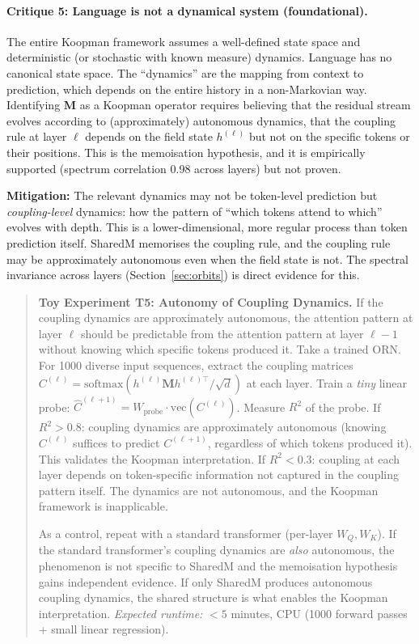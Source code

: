 \documentclass[11pt, a4paper]{article}
\newcommand{\M}{\mathbf{M}}
\theoremstyle{plain}
\theoremstyle{remark}
\begin{document}
\paragraph{Critique 5: Language is not a dynamical system (foundational).}
The entire Koopman framework assumes a well-defined state space and deterministic (or stochastic with known measure) dynamics.
Language has no canonical state space.
The ``dynamics'' are the mapping from context to prediction, which depends on the entire history in a non-Markovian way.
Identifying $\M$ as a Koopman operator requires believing that the residual stream evolves according to (approximately) autonomous dynamics, that the coupling rule at layer $\ell$ depends on the field state $h^{(\ell)}$ but not on the specific tokens or their positions.
This is the memoisation hypothesis, and it is empirically supported (spectrum correlation 0.98 across layers) but not proven.

\textbf{Mitigation:} The relevant dynamics may not be token-level prediction but \emph{coupling-level} dynamics: how the pattern of ``which tokens attend to which'' evolves with depth.
This is a lower-dimensional, more regular process than token prediction itself.
SharedM memorises the coupling rule, and the coupling rule may be approximately autonomous even when the field state is not.
The spectral invariance across layers (Section~\ref{sec:orbits}) is direct evidence for this.

\begin{quote}\small
\textbf{Toy Experiment T5: Autonomy of Coupling Dynamics.}
If the coupling dynamics are approximately autonomous, the attention pattern at layer $\ell$ should be predictable from the attention pattern at layer $\ell{-}1$ without knowing which specific tokens produced it.
Take a trained ORN.
For 1000 diverse input sequences, extract the coupling matrices $C^{(\ell)} = \text{softmax}(h^{(\ell)} \M h^{(\ell)\top}/\sqrt{d})$ at each layer.
Train a \emph{tiny} linear probe: $\hat{C}^{(\ell+1)} = W_{\text{probe}} \cdot \text{vec}(C^{(\ell)})$.
Measure $R^2$ of the probe.
If $R^2 > 0.8$: coupling dynamics are approximately autonomous (knowing $C^{(\ell)}$ suffices to predict $C^{(\ell+1)}$, regardless of which tokens produced it).
This validates the Koopman interpretation.
If $R^2 < 0.3$: coupling at each layer depends on token-specific information not captured in the coupling pattern itself.
The dynamics are not autonomous, and the Koopman framework is inapplicable.

As a control, repeat with a standard transformer (per-layer $W_Q, W_K$).
If the standard transformer's coupling dynamics are \emph{also} autonomous, the phenomenon is not specific to SharedM and the memoisation hypothesis gains independent evidence.
If only SharedM produces autonomous coupling dynamics, the shared structure is what enables the Koopman interpretation.
\emph{Expected runtime:} $<5$ minutes, CPU (1000 forward passes + small linear regression).
\end{quote}
\end{document}
